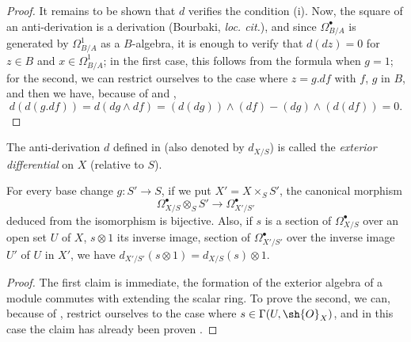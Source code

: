 \begin{proof}
It remains to be shown that $d$ verifies the condition \rm{(i)}.
Now, the square of an anti-derivation is a derivation (Bourbaki, \emph{loc. cit.}), and since $\Omega_{B/A}^\bullet$ is generated by $\Omega_{B/A}^1$ as a $B$-algebra, it is enough to verify that $d(dz) = 0$ for $z \in B$ and $x \in \Omega_{B/A}^1$;
in the first case, this follows from the formula  when $g = 1$;
for the second, we can restrict ourselves to the case where $z = g.df$ with $f$, $g$ in $B$, and then we have, because of  and , 
\[
  d(d(g.df)) = d(dg \wedge df) = (d(dg)) \wedge (df) - (dg) \wedge (d(df)) = 0.
\] 
\end{proof}

\begin{definition}[16.6.3]
\label{IV.16.6.3}
The anti-derivation $d$ defined in  (also denoted by $d_{X/S}$) is called the \emph{exterior differential} on $X$ (relative to $S$). 
\end{definition}

\begin{proposition}[16.6.4]
\label{IV.16.6.4}
For every base change $g:S' \to S$, if we put $X' = X \times_S S'$, the canonical morphism
\[
  \label{IV.16.6.4.1}
  \Omega_{X/S}^\bullet \otimes_S S' \to \Omega_{X'/S'}^\bullet
  \tag{16.6.4.1}
\]
deduced from the isomorphism  is bijective.
Also, if $s$ is a section of $\Omega_{X/S}^\bullet$ over an open set $U$ of $X$, $s \otimes 1$ its inverse image, section of $\Omega_{X'/S'}^\bullet$ over the inverse image $U'$ of $U$ in $X'$, we have $d_{X'/S'}(s \otimes 1) = d_{X/S}(s) \otimes 1$.
\end{proposition}

\begin{proof}
The first claim is immediate, the formation of the exterior algebra of a module commutes with extending the scalar ring.
To prove the second, we can, because of , restrict ourselves to the case where $s \in \Gamma(U, \sh{O}_X)$, and in this case the claim has already been proven .
\end{proof}

